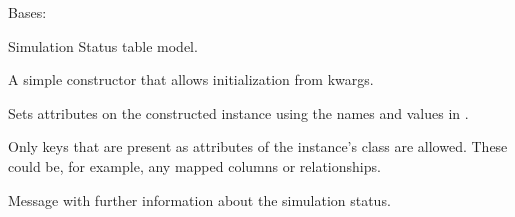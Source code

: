 \documentclass[a4paper,landscape,10pt,english]{sphinxmanual}
\begin{document}
\begin{fulllineitems}
\label{\detokenize{code_docs/simulation_API.model:simulation_API.model.models.SimulationDB}}
Bases: 

Simulation Status table model.

\begin{fulllineitems}
\label{\detokenize{code_docs/simulation_API.model:simulation_API.model.models.SimulationDB.__init__}}
A simple constructor that allows initialization from kwargs.

Sets attributes on the constructed instance using the names and
values in .

Only keys that are present as
attributes of the instance’s class are allowed. These could be,
for example, any mapped columns or relationships.

\end{fulllineitems}


\begin{fulllineitems}
\label{\detokenize{code_docs/simulation_API.model:simulation_API.model.models.SimulationDB.date}}
\end{fulllineitems}


\begin{fulllineitems}
\label{\detokenize{code_docs/simulation_API.model:simulation_API.model.models.SimulationDB.message}}
Message with further information about the simulation status.

\end{fulllineitems}


\end{fulllineitems}
\end{document}
